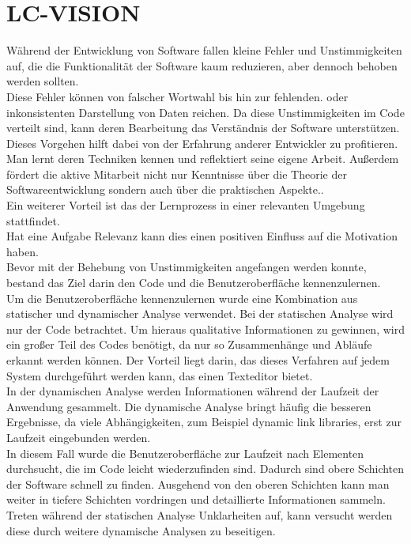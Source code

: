 \documentclass[12pt,a4paper]{article}
\begin{document}
\section{LC-VISION}
Während der Entwicklung von Software fallen kleine Fehler und Unstimmigkeiten auf, die die Funktionalität der Software kaum reduzieren, aber dennoch behoben werden sollten. \\
Diese Fehler können von falscher Wortwahl bis hin zur fehlenden. oder inkonsistenten Darstellung von Daten reichen. Da diese Unstimmigkeiten im Code verteilt sind, kann deren Bearbeitung das Verständnis der Software unterstützen.\\
Dieses Vorgehen hilft dabei von der Erfahrung anderer Entwickler zu profitieren. Man lernt deren Techniken kennen und reflektiert seine eigene Arbeit. Außerdem fördert die aktive Mitarbeit nicht nur Kenntnisse über die Theorie der Softwareentwicklung sondern auch über die praktischen Aspekte.\cite{34908}.\\
Ein weiterer Vorteil ist das der Lernprozess in einer relevanten Umgebung stattfindet\cite{34908}.\\
Hat eine Aufgabe Relevanz kann dies einen positiven Einfluss auf die Motivation haben. \\
Bevor mit der Behebung von Unstimmigkeiten angefangen werden konnte, bestand das Ziel darin den Code und die Benutzeroberfläche kennenzulernen. \\
Um die Benutzeroberfläche kennenzulernen wurde eine Kombination aus statischer und dynamischer Analyse verwendet. Bei der statischen Analyse wird nur der Code betrachtet. Um hieraus qualitative Informationen zu gewinnen, wird ein großer Teil des Codes benötigt, da nur so Zusammenhänge und Abläufe erkannt werden können\cite{mock2003dynamic}. Der Vorteil liegt darin, das dieses Verfahren auf jedem System durchgeführt werden kann, das einen Texteditor bietet. \\
In der dynamischen Analyse werden Informationen während der Laufzeit der Anwendung gesammelt. Die dynamische Analyse bringt häufig die besseren Ergebnisse, da viele Abhängigkeiten, zum Beispiel \glqq dynamic link libraries\grqq, erst zur Laufzeit eingebunden werden\cite{mock2003dynamic}.\\
In diesem Fall wurde die Benutzeroberfläche zur Laufzeit nach Elementen durchsucht, die im Code leicht wiederzufinden sind. Dadurch sind obere Schichten der Software schnell zu finden. Ausgehend von den oberen Schichten kann man weiter in tiefere Schichten vordringen und detaillierte Informationen sammeln. Treten während der statischen Analyse Unklarheiten auf, kann versucht werden diese durch weitere dynamische Analysen zu beseitigen. \\
\end{document}
